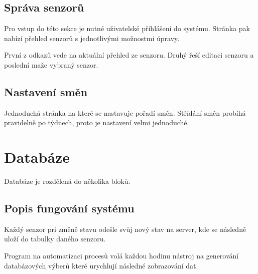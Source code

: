 \subsection{Správa senzorů}
Pro vstup do této sekce je nutné uživatelské přihlášení do systému.
Stránka pak nabízí přehled senzorů s jednotlivými možnostmi úpravy.

První z odkazů vede na aktuální přehled ze senzoru.
Druhý řeší editaci senzoru a poslední maže vybraný senzor.


\subsection{Nastavení směn}
Jednoduchá stránka na které se nastavuje pořadí směn.
Střídání směn probíhá pravidelně po týdnech, proto je nastavení velmi jednoduché.

\section{Databáze}
Databáze je rozdělená do několika bloků.


\subsection{Popis fungování systému}
Každý senzor pri změně stavu odešle svůj nový stav na server, kde se následně uloží do tabulky daného senzoru.

Program na automatizaci procesů volá každou hodinu nástroj na generování databázových výberů které urychlují následné zobrazování dat.



\newpage